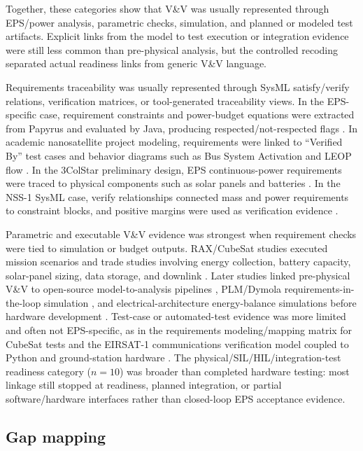 Together, these categories show that V\&V was usually represented through EPS/power analysis, parametric checks, simulation, and planned or modeled test artifacts.  Explicit links from the model to test execution or integration evidence were still less common than pre-physical analysis, but the controlled recoding separated actual readiness links from generic V\&V language.

Requirements traceability was usually represented through SysML satisfy/verify relations, verification matrices, or tool-generated traceability views.  In the EPS-specific case, requirement constraints and power-budget equations were extracted from Papyrus and evaluated by Java, producing respected/not-respected flags \cite{paper-0026}.  In academic nanosatellite project modeling, requirements were linked to ``Verified By'' test cases and behavior diagrams such as Bus System Activation and LEOP flow \cite{paper-0023}.  In the 3ColStar preliminary design, EPS continuous-power requirements were traced to physical components such as solar panels and batteries \cite{paper-0078}.  In the NSS-1 SysML case, verify relationships connected mass and power requirements to constraint blocks, and positive margins were used as verification evidence \cite{paper-0080}.

Parametric and executable V\&V evidence was strongest when requirement checks were tied to simulation or budget outputs.  RAX/CubeSat studies executed mission scenarios and trade studies involving energy collection, battery capacity, solar-panel sizing, data storage, and downlink \cite{paper-0001,paper-0003,paper-0008}.  Later studies linked pre-physical V\&V to open-source model-to-analysis pipelines \cite{paper-0027,paper-0029,paper-0043}, PLM/Dymola requirements-in-the-loop simulation \cite{paper-0059}, and electrical-architecture energy-balance simulations before hardware development \cite{paper-0053}.  Test-case or automated-test evidence was more limited and often not EPS-specific, as in the requirements modeling/mapping matrix for CubeSat tests \cite{paper-0034} and the EIRSAT-1 communications verification model coupled to Python and ground-station hardware \cite{paper-0063}.  The physical/SIL/HIL/integration-test readiness category ($n=10$) was broader than completed hardware testing: most linkage still stopped at readiness, planned integration, or partial software/hardware interfaces rather than closed-loop EPS acceptance evidence.

\subsection{Gap mapping}
\label{sec:results-gap-mapping}

